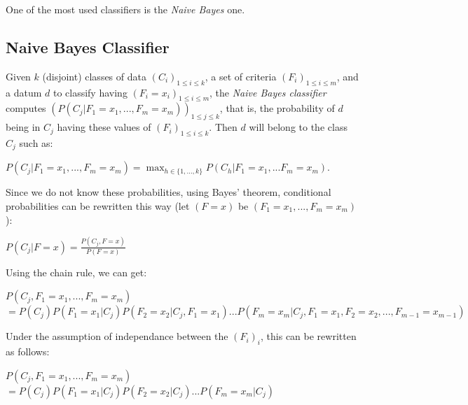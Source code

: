\documentclass{report}
\begin{document}
One of the most used classifiers is the \emph{Naive Bayes} one.

\subsection{Naive Bayes Classifier}

Given $k$ (disjoint) classes of data $(C_{i})_{1 \le i \le k}$, a set of criteria $(F_{i})_{1 \le i \le m}$, and a datum $d$ to classify having $(F_{i} = x_{i})_{1 \le i \le m}$, the \emph{Naive Bayes classifier} computes $(P(C_{j} | F_{1} = x_{1},...,F_{m} = x_{m}))_{1 \le j \le k}$, that is, the probability of $d$ being in $C_{j}$ having these values of $(F_{i})_{1 \le i \le k}$. Then $d$ will belong to the class $C_{j}$ such as:\\

\begin{center}
$P(C_{j} | F_{1} = x_{1}, ..., F_{m} = x_{m}) = \max_{h \in \{ 1, ..., k \}}P(C_{h} | F_{1} = x_{1}, ... F_{m} = x_{m})$.\\
\end{center}

Since we do not know these probabilities, using Bayes' theorem, conditional probabilities can be rewritten this way (let $(F = x)$ be $(F_{1} = x_{1}, ..., F_{m} = x_{m})$):\\

\begin{center}
$P(C_{j} | F = x) = \frac{P(C_{j},F = x)}{P(F = x)}$\\ 
\end{center}

Using the chain rule, we can get:\\

\begin{center}
$P(C_{j},F_{1} = x_{1}, ..., F_{m} = x_{m})$\\ 
$= P(C_{j})P(F_{1} = x_{1} | C_{j})P(F_{2} = x_{2} | C_{j}, F_{1} = x_{1}) ... P(F_{m} = x_{m} | C_{j}, F_{1} = x_{1}, F_{2} = x_{2}, ..., F_{m-1} = x_{m-1})$\\
\end{center}

Under the assumption of independance between the $(F_{i})_{i}$, this can be rewritten as follows:\\

\begin{center}
$P(C_{j},F_{1} = x_{1}, ..., F_{m} = x_{m})$\\ 
$= P(C_{j})P(F_{1} = x_{1} | C_{j})P(F_{2} = x_{2} | C_{j}) ... P(F_{m} = x_{m} | C_{j})$\\
\end{center}
\end{document}
